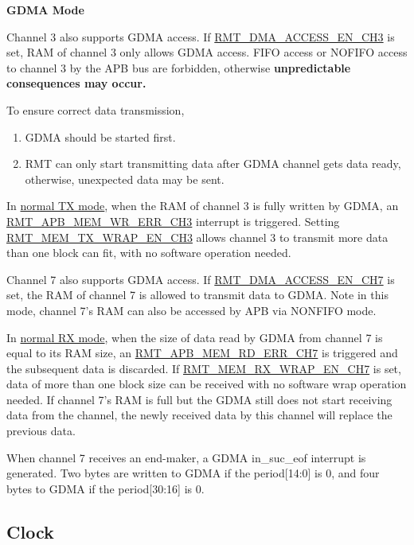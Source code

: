 \documentclass[main\_\_EN.tex]{subfiles}
\begin{document}
\textbf{GDMA Mode}

Channel 3 also supports GDMA access. If \hyperref[fielddesc:RMTDMAACCESSENCH3]{RMT\_DMA\_ACCESS\_EN\_CH3} is set, RAM of channel 3 only allows GDMA access. FIFO access or NOFIFO access to channel 3 by the APB bus are forbidden, otherwise \textbf{unpredictable consequences may occur.}

To ensure correct data transmission,
\begin{enumerate}
    \item GDMA should be started first.
    \item RMT can only start transmitting data after GDMA channel gets data ready, otherwise, unexpected data may be sent.
\end{enumerate}


In \hyperref[sec:normal-tx-mode]{normal TX mode}, when the RAM of channel 3 is fully written by GDMA, an \hyperref[fielddesc:RMTAPBMEMWRERRCHN]{RMT\_APB\_MEM\_WR\_ERR\_CH3} interrupt is triggered. Setting \hyperref[fielddesc:RMTMEMTXWRAPENCHN]{RMT\_MEM\_TX\_WRAP\_EN\_CH3} allows channel 3 to transmit more data than one block can fit, with no software operation needed.


Channel 7 also supports GDMA access. If \hyperref[fielddesc:RMTDMAACCESSENCH7]{RMT\_DMA\_ACCESS\_EN\_CH7} is set, the RAM of channel 7 is allowed to transmit data to GDMA. Note in this mode, channel 7's RAM can also be accessed by APB via NONFIFO mode.

In \hyperref[sec:normal-rx-mode]{normal RX mode}, when the size of data read by GDMA from channel 7 is equal to its RAM size, an \hyperref[fielddesc:RMTAPBMEMRDERRCHM]{RMT\_APB\_MEM\_RD\_ERR\_CH7} is triggered and the subsequent data is discarded. If \hyperref[fielddesc:RMTMEMRXWRAPENCHM]{RMT\_MEM\_RX\_WRAP\_EN\_CH7} is set, data of more than one block size can be received with no software wrap operation needed. If channel 7's RAM is full but the GDMA still does not start receiving data from the channel, the newly received data by this channel will replace the previous data.

\begin{tiplisting}
When channel 7 receives an end-maker, a GDMA in\_suc\_eof interrupt is generated. Two bytes are written to GDMA if the period[14:0] is 0, and four bytes to GDMA if the period[30:16] is 0.
\end{tiplisting}


\subsection{Clock}\label{clock}
\end{document}
